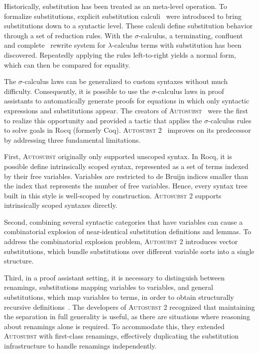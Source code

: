 \documentclass[screen,nonacm]{acmart}
\begin{document}
Historically, substitution has been treated as an meta-level operation. To
formalize substitutions, explicit substitution
calculi~\cite{10.1145/96709.96712} were introduced to bring substitutions down
to a syntactic level. These calculi define substitution behavior through a set
of reduction rules. With the $σ$-calculus, a terminating,
confluent~\cite{10.1145/226643.226675} and
complete~\cite{10.1145/2676724.2693163} rewrite system for $λ$-calculus terms
with substitution has been discovered. Repeatedly applying the rules
left-to-right yields a normal form, which can then be compared for equality.

The $σ$-calculus laws can be generalized to custom syntaxes without much
difficulty. Consequently, it is possible to use the $σ$-calculus laws in proof
assistants to automatically generate proofs for equations in which only
syntactic expressions and substitutions appear. The creators of
\textsc{Autosubst}~\cite{schafer2015autosubst} were the first to realize this
opportunity and provided a tactic that applies the $σ$-calculus rules to solve
goals in Rocq (formerly Coq). \textsc{Autosubst
      2}~\cite{10.1145/3293880.3294101} improves on its predecessor by addressing
three fundamental limitations.

First, \textsc{Autosubst} originally only supported unscoped syntax. In Rocq,
it is possible define intrinsically scoped syntax, represented as a set of
terms indexed by their free variables. Variables are restricted to de Bruijn
indices smaller than the index that represents the number of free variables.
Hence, every syntax tree built in this style is well-scoped by construction.
\textsc{Autosubst 2} supports intrinsically scoped syntaxes directly.

Second, combining several syntactic categories that have variables can cause a
combinatorial explosion of near-identical substitution definitions and lemmas.
To address the combinatorial explosion problem, \textsc{Autosubst 2} introduces
vector substitutions, which bundle substitutions over different variable sorts
into a single structure.

Third, in a proof assistant setting, it is necessary to distinguish between
renamings, substitutions mapping variables to variables, and general
substitutions, which map variables to terms, in order to obtain structurally
recursive definitions~\cite{10.1007/11617990_1}. The developers of
\textsc{Autosubst 2} recognized that maintaining the separation in full
generality is useful, as there are situations where reasoning about renamings
alone is required. To accommodate this, they extended \textsc{Autosubst} with
first-class renamings, effectively duplicating the substitution infrastructure
to handle renamings independently.
\end{document}
